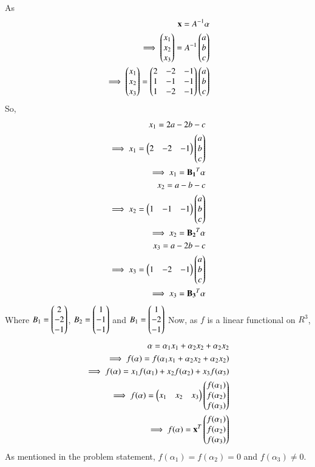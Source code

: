 \documentclass[journal,12pt,twocolumn]{IEEEtran}
\begin{document}
As
\begin{align}
\mathbf{x} = A^{-1} \mathbf{\alpha}\\
\implies \begin{pmatrix}x_1\\x_2\\x_3\end{pmatrix}= A^{-1} \begin{pmatrix}a\\b\\c\end{pmatrix}\\
\implies \begin{pmatrix}x_1\\x_2\\x_3\end{pmatrix}= \begin{pmatrix}2 & -2 & -1\\1 & -1 & -1\\1 & -2 & -1\end{pmatrix} \begin{pmatrix}a\\b\\c\end{pmatrix}
\end{align}
So, 
\begin{align}
x_1 = 2a-2b-c\\
\implies x_1 = \begin{pmatrix}2 & -2 & -1\end{pmatrix}\begin{pmatrix}a\\b\\c\end{pmatrix}\\
\implies x_1 = \mathbf{B_1}^T \mathbf{\alpha}\\
x_2= a-b-c \\
\implies x_2 = \begin{pmatrix}1 & -1 & -1\end{pmatrix}\begin{pmatrix}a\\b\\c\end{pmatrix}\\
\implies x_2 = \mathbf{B_2}^T \mathbf{\alpha}\\
x_3= a-2b-c\\
\implies x_3 = \begin{pmatrix}1 & -2 & -1\end{pmatrix}\begin{pmatrix}a\\b\\c\end{pmatrix}\\
\implies x_3 = \mathbf{B_3}^T \mathbf{\alpha}
\end{align}
Where $B_1 = \begin{pmatrix}2\\-2\\-1\end{pmatrix}$, $B_2 = \begin{pmatrix}1\\-1\\-1\end{pmatrix}$ and $B_1 = \begin{pmatrix}1\\-2\\-1\end{pmatrix}$
Now, as $f$ is a linear functional on $R^3$,
\begin{align}
\mathbf{\alpha} = \alpha_1 x_1 + \alpha_2 x_2 + \alpha_2 x_2\\
\implies f(\alpha) = f(\alpha_1 x_1 + \alpha_2 x_2 + \alpha_2 x_2)\\
\implies f(\alpha) = x_1 f(\alpha_1) + x_2f(\alpha_2)+ x_3f(\alpha_3)\\
\implies f(\alpha) = \begin{pmatrix}x_1 & x_2 & x_3\end{pmatrix} \begin{pmatrix}f(\alpha_1)\\f(\alpha_2)\\f(\alpha_3)\end{pmatrix}\\
\implies f(\alpha) = \mathbf{x}^T \begin{pmatrix}f(\alpha_1)\\f(\alpha_2)\\f(\alpha_3)\end{pmatrix}
\end{align}
As mentioned in the problem statement, $f(\alpha_1)=f(\alpha_2)=0$ and $f(\alpha_3)\neq 0$.
\end{document}

